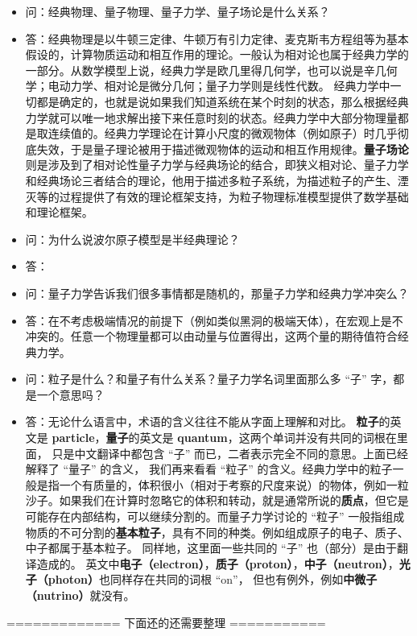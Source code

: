 \begin{itemize}
\item 问：经典物理、量子物理、量子力学、量子场论是什么关系？
\item 答：经典物理是以牛顿三定律、牛顿万有引力定律、麦克斯韦方程组等为基本假设的，计算物质运动和相互作用的理论。一般认为相对论也属于经典力学的一部分。从数学模型上说，经典力学是欧几里得几何学，也可以说是辛几何学；电动力学、相对论是微分几何；量子力学则是线性代数。 经典力学中一切都是确定的，也就是说如果我们知道系统在某个时刻的状态，那么根据经典力学就可以唯一地求解出接下来任意时刻的状态。经典力学中大部分物理量都是取连续值的。经典力学理论在计算小尺度的微观物体（例如原子）时几乎彻底失效，于是量子理论被用于描述微观物体的运动和相互作用规律。\textbf{量子场论}则是涉及到了相对论性量子力学与经典场论的结合，即狭义相对论、量子力学和经典场论三者结合的理论，他用于描述多粒子系统，为描述粒子的产生、湮灭等的过程提供了有效的理论框架支持，为粒子物理标准模型提供了数学基础和理论框架。
\item 问：为什么说波尔原子模型是半经典理论？
\item 答：
\item 问：量子力学告诉我们很多事情都是随机的，那量子力学和经典力学冲突么？
\item 答：在不考虑极端情况的前提下（例如类似黑洞的极端天体），在宏观上是不冲突的。任意一个物理量都可以由动量与位置得出，这两个量的期待值符合经典力学。
\item 问：粒子是什么？和量子有什么关系？量子力学名词里面那么多 “子” 字，都是一个意思吗？
\item 答：无论什么语言中，术语的含义往往不能从字面上理解和对比。 \textbf{粒子}的英文是 \textbf{particle}，\textbf{量子}的英文是 \textbf{quantum}，这两个单词并没有共同的词根在里面， 只是中文翻译中都包含 “子” 而已，二者表示完全不同的意思。上面已经解释了 “量子” 的含义， 我们再来看看 “粒子” 的含义。经典力学中的粒子一般是指一个有质量的，体积很小（相对于考察的尺度来说）的物体，例如一粒沙子。如果我们在计算时忽略它的体积和转动，就是通常所说的\textbf{质点}，但它是可能存在内部结构，可以继续分割的。而量子力学讨论的 “粒子” 一般指组成物质的不可分割的\textbf{基本粒子}，具有不同的种类。例如组成原子的电子、质子、中子都属于基本粒子。 同样地，这里面一些共同的 “子” 也（部分）是由于翻译造成的。 英文中\textbf{电子（electron）}，\textbf{质子（proton）}，\textbf{中子（neutron）}，\textbf{光子（photon）}也同样存在共同的词根 “on”， 但也有例外，例如\textbf{中微子（nutrino）}就没有。
\end{itemize}


============= 下面还的还需要整理 ===========

